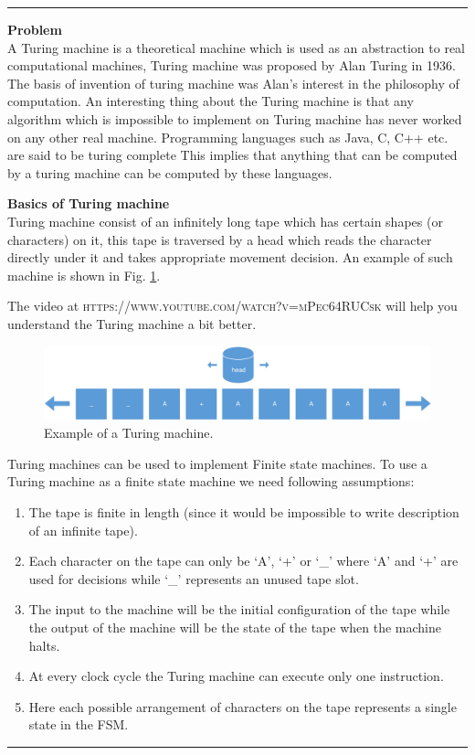 \documentclass[a4paper,10pt]{article}
\theoremstyle{mytheor}
\newcounter{problemNumber}
\newcommand {
  \insertProblem}[1]{
  \vspace{0.5cm}
  \hrule
  \vspace{0.3cm}

  {\color{greatblue}\textbf{\large{Problem \theproblemNumber}}}
  \vspace{2pt}\\#1

  \addtocounter{problemNumber}{1}
  \vspace{0.2cm}
  \hrule  
  \vspace{0.5cm}
}
\begin{document}
 \insertProblem { A Turing machine is a theoretical machine which is
   used as an abstraction to real computational machines, Turing
   machine was proposed by Alan Turing in 1936. The basis of invention
   of turing machine was Alan's interest in the philosophy of
   computation. An interesting thing about the Turing machine is that
   any algorithm which is impossible to implement on Turing machine
   has never worked on any other real machine. Programming languages
   such as Java, C, C++ etc. are said to be turing complete This
   implies that anything that can be computed by a turing machine can
   be computed by these languages.

   \textbf{Basics of Turing machine}\\ Turing machine consist of an
   infinitely long tape which has certain shapes (or characters) on
   it, this tape is traversed by a head which reads the character
   directly under it and takes appropriate movement decision. An
   example of such machine is shown in
   Fig. \ref{Fig:turing-machine-example}.

   The video at \textsc{https://www.youtube.com/watch?v=mPec64RUCsk}
   will help you understand the Turing machine a bit better.

  \begin{figure}[!h] \centering  
    \includegraphics[width=\linewidth]{./resources/turingMachine.pdf} 
    \caption{Example of a Turing machine.} 
    \label{Fig:turing-machine-example} 
  \end{figure}

  Turing machines can be used to implement Finite state machines. To use
  a Turing machine as a finite state machine we need following
  assumptions:
  \begin{enumerate}
  \item The tape is finite in length (since it would be impossible
    to write description of an infinite tape).
  \item Each character on the tape can only be `A', `+' or `\_' where
    `A' and `+' are used for decisions while `\_' represents an unused
    tape slot.
  \item The input to the machine will be the initial configuration
    of the tape while the output of the machine will be the state of
    the tape when the machine halts.
  \item At every clock cycle the Turing machine can execute only one
    instruction.
  \item Here each possible arrangement of characters on the tape
    represents a single state in the FSM.
  \end{enumerate}

}
\end{document}
